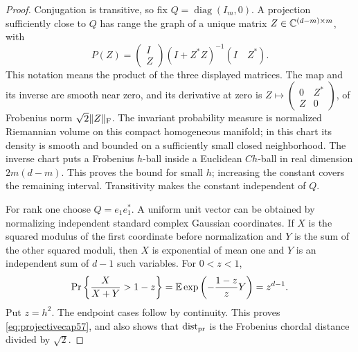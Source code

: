 \begin{proof}
Conjugation is transitive, so fix $Q=\operatorname{diag}(I_m,0)$. A projection sufficiently close to $Q$ has range the graph of a unique matrix $Z\in\mathbb C^{(d-m)\times m}$, with
\[
 P(Z)=\begin{pmatrix}I\\Z\end{pmatrix}(I+Z^*Z)^{-1}(I\quad Z^*).
\]
This notation means the product of the three displayed matrices. The map and its inverse are smooth near zero, and its derivative at zero is $Z\mapsto\left(\begin{smallmatrix}0&Z^*\\Z&0\end{smallmatrix}\right)$, of Frobenius norm $\sqrt2\|Z\|_{\rm F}$. The invariant probability measure is normalized Riemannian volume on this compact homogeneous manifold; in this chart its density is smooth and bounded on a sufficiently small closed neighborhood. The inverse chart puts a Frobenius $h$-ball inside a Euclidean $Ch$-ball in real dimension $2m(d-m)$. This proves the bound for small $h$; increasing the constant covers the remaining interval. Transitivity makes the constant independent of $Q$.

For rank one choose $Q=e_1e_1^*$. A uniform unit vector can be obtained by normalizing independent standard complex Gaussian coordinates. If $X$ is the squared modulus of the first coordinate before normalization and $Y$ is the sum of the other squared moduli, then $X$ is exponential of mean one and $Y$ is an independent sum of $d-1$ such variables. For $0<z<1$,
\[
 \Pr\left\{\frac{X}{X+Y}>1-z\right\}
 =\mathbb E\exp\left(-\frac{1-z}{z}Y\right)=z^{d-1}.
\]
Put $z=h^2$. The endpoint cases follow by continuity. This proves \eqref{eq:projectivecap57}, and also shows that $\operatorname{dist}_{\rm pr}$ is the Frobenius chordal distance divided by $\sqrt2$.
\end{proof}

